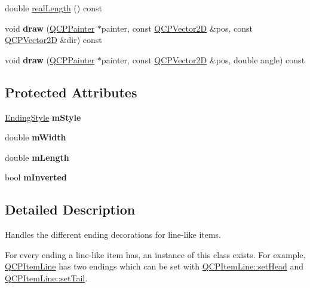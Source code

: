 \begin{DoxyCompactItemize}
double \hyperlink{class_q_c_p_line_ending_acacd24d386d459b282d3c57f16a5405d}{real\+Length} () const
\item 
\mbox{\label{class_q_c_p_line_ending_a4f45db54f2aba03acf055e29aec1e8e7}} 
void {\bfseries draw} (\hyperlink{class_q_c_p_painter}{Q\+C\+P\+Painter} $\ast$painter, const \hyperlink{class_q_c_p_vector2_d}{Q\+C\+P\+Vector2D} \&pos, const \hyperlink{class_q_c_p_vector2_d}{Q\+C\+P\+Vector2D} \&dir) const
\item 
\mbox{\label{class_q_c_p_line_ending_af7ac30a81ba85b9bded148c6ec387391}} 
void {\bfseries draw} (\hyperlink{class_q_c_p_painter}{Q\+C\+P\+Painter} $\ast$painter, const \hyperlink{class_q_c_p_vector2_d}{Q\+C\+P\+Vector2D} \&pos, double angle) const
\end{DoxyCompactItemize}
\subsection*{Protected Attributes}
\begin{DoxyCompactItemize}
\item 
\mbox{\label{class_q_c_p_line_ending_a4696fc9117b60f1ca7690fcd2ba56611}} 
\hyperlink{class_q_c_p_line_ending_a5ef16e6876b4b74959c7261d8d4c2cd5}{Ending\+Style} {\bfseries m\+Style}
\item 
\mbox{\label{class_q_c_p_line_ending_aca89d21341133c20dc6825c33a5eac48}} 
double {\bfseries m\+Width}
\item 
\mbox{\label{class_q_c_p_line_ending_ae8e1e2566b96c05736cd92662dba8af8}} 
double {\bfseries m\+Length}
\item 
\mbox{\label{class_q_c_p_line_ending_a91306fe771d54c955e0af21af14349d5}} 
bool {\bfseries m\+Inverted}
\end{DoxyCompactItemize}


\subsection{Detailed Description}
Handles the different ending decorations for line-\/like items. 

 For every ending a line-\/like item has, an instance of this class exists. For example, \hyperlink{class_q_c_p_item_line}{Q\+C\+P\+Item\+Line} has two endings which can be set with \hyperlink{class_q_c_p_item_line_aebf3d687114d584e0459db6759e2c3c3}{Q\+C\+P\+Item\+Line\+::set\+Head} and \hyperlink{class_q_c_p_item_line_ac264222c3297a7efe33df9345c811a5f}{Q\+C\+P\+Item\+Line\+::set\+Tail}.

